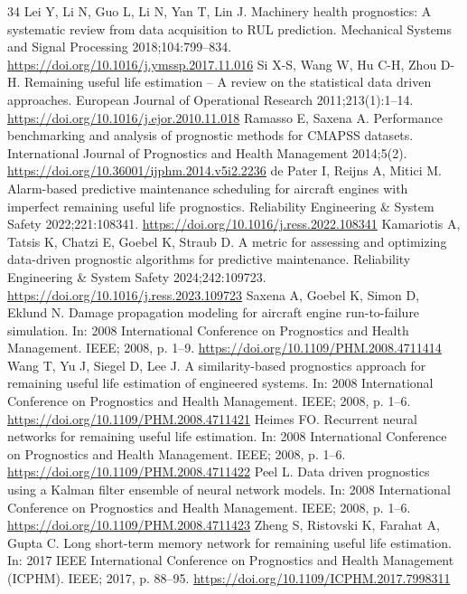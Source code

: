 \documentclass[a4paper,fleqn,doubleblind]{cas-dc}
\begin{document}
\begin{thebibliography}{34}
 Lei Y, Li N, Guo L, Li N, Yan T, Lin J. Machinery health prognostics: A systematic review from data acquisition to RUL prediction. Mechanical Systems and Signal Processing 2018;104:799--834. \url{https://doi.org/10.1016/j.ymssp.2017.11.016}
 Si X-S, Wang W, Hu C-H, Zhou D-H. Remaining useful life estimation -- A review on the statistical data driven approaches. European Journal of Operational Research 2011;213(1):1--14. \url{https://doi.org/10.1016/j.ejor.2010.11.018}
 Ramasso E, Saxena A. Performance benchmarking and analysis of prognostic methods for CMAPSS datasets. International Journal of Prognostics and Health Management 2014;5(2). \url{https://doi.org/10.36001/ijphm.2014.v5i2.2236}
 de Pater I, Reijns A, Mitici M. Alarm-based predictive maintenance scheduling for aircraft engines with imperfect remaining useful life prognostics. Reliability Engineering \& System Safety 2022;221:108341. \url{https://doi.org/10.1016/j.ress.2022.108341}
 Kamariotis A, Tatsis K, Chatzi E, Goebel K, Straub D. A metric for assessing and optimizing data-driven prognostic algorithms for predictive maintenance. Reliability Engineering \& System Safety 2024;242:109723. \url{https://doi.org/10.1016/j.ress.2023.109723}
 Saxena A, Goebel K, Simon D, Eklund N. Damage propagation modeling for aircraft engine run-to-failure simulation. In: 2008 International Conference on Prognostics and Health Management. IEEE; 2008, p. 1--9. \url{https://doi.org/10.1109/PHM.2008.4711414}
 Wang T, Yu J, Siegel D, Lee J. A similarity-based prognostics approach for remaining useful life estimation of engineered systems. In: 2008 International Conference on Prognostics and Health Management. IEEE; 2008, p. 1--6. \url{https://doi.org/10.1109/PHM.2008.4711421}
 Heimes FO. Recurrent neural networks for remaining useful life estimation. In: 2008 International Conference on Prognostics and Health Management. IEEE; 2008, p. 1--6. \url{https://doi.org/10.1109/PHM.2008.4711422}
 Peel L. Data driven prognostics using a Kalman filter ensemble of neural network models. In: 2008 International Conference on Prognostics and Health Management. IEEE; 2008, p. 1--6. \url{https://doi.org/10.1109/PHM.2008.4711423}
 Zheng S, Ristovski K, Farahat A, Gupta C. Long short-term memory network for remaining useful life estimation. In: 2017 IEEE International Conference on Prognostics and Health Management (ICPHM). IEEE; 2017, p. 88--95. \url{https://doi.org/10.1109/ICPHM.2017.7998311}

\end{thebibliography}
\end{document}
